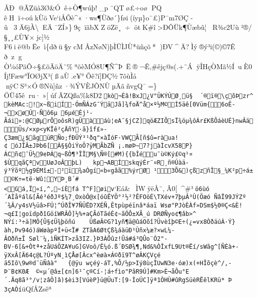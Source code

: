 {ÅÐ@ÃZüà3Ø\&Óê+Ò¶wúþ!\_p¨QTø£÷oø PQ
êHï÷oúkÙöVe`iÅÕè\^{}«·ws¶Ùðø´\}føi(íyµ\}o¯£)P¯m7ØÇ­û3Ä6jÀ\textbackslash\textbarEÄ¯ZÍ»\}9çïãbXZöZë¸÷ötK\#î\textgreater ÐÔÜk¶Ùæbû¦R¾c2Uù²®/
§¸¸£Ù¥×j­c{]}½
F6ië@bËeì\{dðü§ycMÅzNøN)þÌÜÌJÙ*\textquotesingle üñçõ*)ÐV\^{}Ä?Ìý®ý³i(©)©7Ê 
ðz\textquotesinglegÒ ¼óPäÔ÷§£õÃöÄ¨\%ªõèMÓ8U¶Ñ\^{}Þ~Ë®¬Ê,\#êjç@s(.+¨ÁÿÎHçÒMã½Í~uÈ0Íj!Fæw°ÏOØjX³(ßaÙ.e¥°Õê?í{]}ÐÇ½7ôùÌå
nÿCS³×Ó®Nù{]}ñz·¾ÝVÈJÔNÙµÄãñvgQ¯=\}ÖÜ45êru·»{[}úfÂZQßa\%k8D2\texttt{kò¬Èâ!\textbar{}BxJ¿V"ÜKÝÚØ¸ü§\ \ ´®ï®\textbackslash{}çõÞzr\^{}kèM­Ac:!x\textasciitilde{}ßiÍ-ÓmÑÁzG¯ÝäJã{]}¾foÄ\^{}å×º½M©Ì5äê{[}0V\textquotesingle{}üm\{6oÊ­¬x\textquotesingle{}øÚ·Ñô6µ\ 6µéÉj¹­Ãái»:@CØµrÔoôsR)gÜàáù¦eA¯§jCZ{]}qöÆZIÕsÏ¾öµ¾ôÁr£Kß\textbar{}ÔáèUÉ\}nwÂäÜs/×xp\textless{}yKÏê²çÄñY·ã\}îf£»­Ç3æm¿\$ãgüRÑo;fÐÛÝ³¹ðq"×àÏóF·VWÇÃ{[}ñ\$û=ràua!¢\ óJÎÂ±JÞb6{[} À§§ÒiÝoÖ?ÿMÃbZÑ~¡.møÞ\textasciitilde{}7?jàÌcvX58P\}ÀCñ¢¯Ü½9eÞÁq\textasciitilde{}ßÒ¶³ÏÏM§\textbackslash{}Ñ®{[}\#M)\{\{bÎéu¯ù©Ký£©q¹¤\$ÙqãÇªvUøJoÂþL\textbar{})\ \ \ kp¬ABÍskqýÉr¨¤R¸ñ®Úàä­ý³Ýõº½g9ÉMî±-²ï¾aÒgí«b«gâã\%ýrØ\ ¹3Õ\&)çß zñÎ§\_¼K²p÷á±©K÷=të·Wû¦YÞ¸B´\#\textless{}Gá\textasciigrave{}\textasciigrave{},Ï«í,\^{},\textasciitilde{}íÈfá~T\^{}F{]}øiv}`Eá\&ÌWÿëÅ¨,Â0{[}\^{}\#³\texttt{ö6ùó´AÌåºál\&{[}Ãé³éðJº\$¼7\textbar{}¸OxòÓ@x{[}óûËYÖ°²½²?ÊFOöÉ\textbackslash{}TXév+7þµÂ³Ù(Öæó~ÑâÏ99JÝZº´¾Â/y4sV½ü­â\textgreater{}FÚ¦\^{}ÚðÎ¥7ÑÜËD?XÉÑ, Êtpùpéïnâ*áaï\ Wsø"PJòÈÀf»DSm\$\textquotesingle{}½0®Ç\textless{}\&È!¬q£I¦­goïdpðîGöíWRÂÓ{]}½\%+aÇÃóTãéÈ¢\textasciitilde{}ãÓÔ±X\textquotesingle{}Ã\_ú\ DRØÑyo¢¶âb\textgreater{}\^{}NÝí:³÷ä{]}MÓ\{Û§¢Ü¾þöñú\ \ \ \ ÙßøÂ©G?1yñ¶ä@ûáOõî?Üvèîþ©E÷(¿=vx8ÒðäúÁ\textquotesingle{}·Ý\}àh,Þv94\textbar{}ó)áWøàpºÍ+ü\textless{}Ï\#\ ZTãA6ØtÇß¾áàüÐ¹Ùñx¼æ?×wL\textquotesingle{}¼-ÂOðñ±Î~Søl¨¼,ìÑKÍT\textgreater{}zå3IZ.\}Þ3ÀÕûz!Ûá\#á³QÛo¨Ó2"­ÐV·6{[}\&+Òtª+zåUáÖZA¥uG{]}GVoô/Ê¼­ó.ß´ÐSØ¾¶,Nd\&\%ÒÎxfL9Ut®Ëí/sWãg\^{}{[}ÑÈà+­ÿXxÂ{[}Ä64ç@L?ÚºyN¸ìÇÅø{[}Âcx\^{}è øà×Á©ðï9T\^{}øÂKÇVçéä5Iô\textbackslash{}9w®d¯üÑâà"\ \ \ \{@ÿu~wçéý-áT,\%Ô/½p\textgreater{}Iý8ùçÏUwN3e·óæ)x\textquotesingle{}(+HÎõçè\^{}/,­Þ¨B¢K0Æ\ \ ©«µ´@â±{[}¢n{]}6¹¯ç®Cí-¦á÷fìo"PãR9Ú{]}\#Km\textgreater{}È¬åÔu°­E´.Äq8ã³°/v¦zâÒ{]}â)\$èi3{[}VúèP\}ü@ÜuT:{[}9·ÌoÚC{]}ÿª1ÒHÙ\#ûRgSüèRËêlKRü*\ ­Þ3çAÒí}üQfÅZsêª
}
